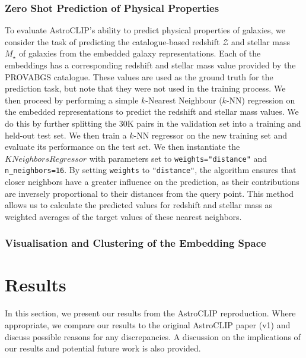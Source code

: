 \documentclass[a4paper,12pt]{article}
\begin{document}
\subsubsection*{Zero Shot Prediction of Physical Properties}
To evaluate AstroCLIP's ability to predict physical properties of galaxies, we consider the task of predicting the catalogue-based redshift $\mathcal{Z}$ and stellar mass $M_{\star}$ of galaxies from the embedded galaxy representations. Each of the embeddings has a corresponding redshift and stellar mass value provided by the PROVABGS catalogue. These values are used as the ground truth for the prediction task, but note that they were not used in the training process. We then proceed by performing a simple $k$-Nearest Neighbour ($k$-NN) regression on the embedded representations to predict the redshift and stellar mass values. 
We do this by further splitting the 30K pairs in the validation set into a training and held-out test set. We then train a $k$-NN regressor on the new training set and evaluate its performance on the test set. We then instantiate the $KNeighborsRegressor$ with parameters set to \texttt{weights="distance"} and \texttt{n\_neighbors=16}. By setting \texttt{weights} to \texttt{"distance"}, the algorithm ensures that closer neighbors have a greater influence on the prediction, as their contributions are inversely proportional to their distances from the query point. This method allows us to calculate the predicted values for redshift and stellar mass as weighted averages of the target values of these nearest neighbors. 

\subsubsection*{Visualisation and Clustering of the Embedding Space}


\section{Results}
In this section, we present our results from the AstroCLIP reproduction. Where appropriate, we compare our results to the original AstroCLIP paper (v1) \cite{astroclip} and discuss possible reasons for any discrepancies. A discussion on the implications of our results and potential future work is also provided.
\end{document}
